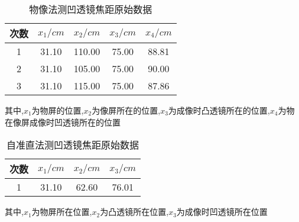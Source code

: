\documentclass[a4 paper,12pt]{article}
\begin{document}
\begin{table}[H] 
	\caption{物像法测凹透镜焦距原始数据}
	\label{物像法测凹透镜焦距原始数据}
	\centering
	    \begin{tabular}{ccccc}
	        \toprule[0.5mm]
	        次数 & $x_{1}/cm$  & $x_{2}/cm $ & $x_{3}/cm$  & $x_{4}/cm$  \\
	        \midrule
          	1 & 31.10  & 110.00  & 75.00  & 88.81  \\
	        2 & 31.10  & 105.00  & 75.00  & 90.00  \\
	        3 & 31.10  & 115.00  & 75.00 & 87.86  \\
         	\bottomrule[0.5mm]
     \end{tabular}
 \end{table}
其中,$x_{1}$为物屏的位置,$x_{2}$为像屏所在的位置,$x_{3}$为成像时凸透镜所在的位置,$x_{4}$为物在像屏成像时凹透镜所在的位置
\begin{table}[H] 
	\caption{自准直法测凹透镜焦距原始数据}
	\label{自准直法测凹透镜焦距原始数据}
	\centering
		\begin{tabular}{cccc}
			\toprule[0.5mm]
			次数 & $x_{1}/cm$ & $x_{2}/cm$ & $x_{3}/cm$ \\
			\midrule
			1 & 31.10 & 62.60 & 76.01 \\
			\bottomrule[0.5mm]
	\end{tabular}
\end{table}
其中,$x_{1}$为物屏所在位置,$x_{2}$为凸透镜所在位置,$x_{3}$为成像时凹透镜所在位置
\end{document}
